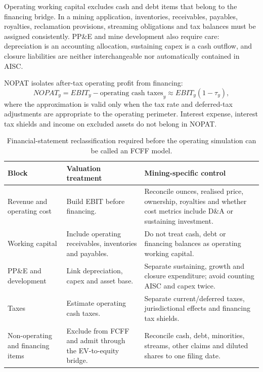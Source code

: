 Operating working capital excludes cash and debt items that belong to the
financing bridge. In a mining application, inventories, receivables, payables,
royalties, reclamation provisions, streaming obligations and tax balances
must be assigned consistently. PP\&E and mine development also require care:
depreciation is an accounting allocation, sustaining capex is a cash outflow,
and closure liabilities are neither interchangeable nor automatically
contained in AISC.

NOPAT isolates after-tax operating profit from financing:
\begin{equation}
NOPAT_y=EBIT_y-\text{operating cash taxes}_y
       \approx EBIT_y(1-\tau_y),
\end{equation}
where the approximation is valid only when the tax rate and deferred-tax
adjustments are appropriate to the operating perimeter. Interest expense,
interest tax shields and income on excluded assets do not belong in NOPAT.

\begin{table}[H]
\centering
\small
\renewcommand{\arraystretch}{1.10}
\begin{tabularx}{\textwidth}{@{}p{3.0cm}p{4.2cm}X@{}}
\toprule
Block & Valuation treatment & Mining-specific control \\
\midrule
Revenue and operating cost & Build EBIT before financing. & Reconcile ounces,
realised price, ownership, royalties and whether cost metrics include D\&A or
sustaining investment. \\
Working capital & Include operating receivables, inventories and payables. &
Do not treat cash, debt or financing balances as operating working capital. \\
PP\&E and development & Link depreciation, capex and asset base. & Separate
sustaining, growth and closure expenditure; avoid counting AISC and capex
twice. \\
Taxes & Estimate operating cash taxes. & Separate current/deferred taxes,
jurisdictional effects and financing tax shields. \\
Non-operating and financing items & Exclude from FCFF and admit through the
EV-to-equity bridge. & Reconcile cash, debt, minorities, streams, other claims
and diluted shares to one filing date. \\
\bottomrule
\end{tabularx}
\caption{Financial-statement reclassification required before the operating
simulation can be called an FCFF model.}
\label{tab:dcf-reclassification}
\end{table}

